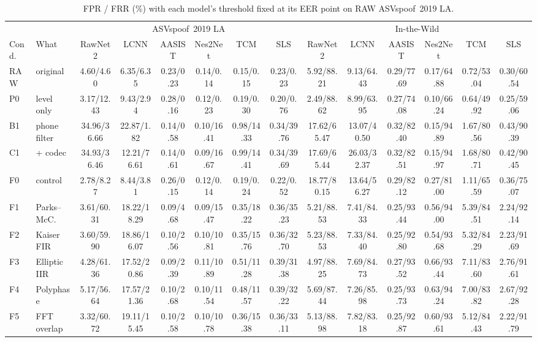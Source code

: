 \documentclass[conference]{IEEEtran}
\begin{document}
\begin{table}[t]
\centering
\caption{FPR / FRR (\%) with each model's threshold fixed at its EER point on RAW ASVspoof~2019 LA.}
\label{tab:fprfrr}
\setlength{\tabcolsep}{2.5pt}
\begin{tabular}{ll|cccccc|cccccc}
\toprule
 & & \multicolumn{6}{c|}{ASVspoof~2019 LA} & \multicolumn{6}{c}{In-the-Wild} \\
Cond. & What & RawNet2 & LCNN & AASIST & Nes2Net & TCM & SLS & RawNet2 & LCNN & AASIST & Nes2Net & TCM & SLS \\
\midrule
RAW & original     & 4.60/4.60 & 6.35/6.35 & 0.23/0.23 & 0.14/0.14 & 0.15/0.15 & 0.23/0.23 & 5.92/88.21 & 9.13/64.43 & 0.29/77.69 & 0.17/64.88 & 0.72/53.04 & 0.30/60.54 \\
P0  & level only   & 3.17/12.43 & 9.43/2.94 & 0.28/0.16 & 0.12/0.23 & 0.19/0.30 & 0.20/0.76 & 2.49/88.62 & 8.99/63.95 & 0.27/74.08 & 0.10/66.24 & 0.64/49.92 & 0.25/59.06 \\
B1  & phone filter & 34.96/36.66 & 22.87/1.82 & 0.14/0.58 & 0.10/16.41 & 0.98/14.33 & 0.34/39.76 & 17.62/65.47 & 13.07/40.50 & 0.32/82.40 & 0.15/94.89 & 1.67/80.56 & 0.43/90.39 \\
C1  & + codec      & 34.93/36.46 & 12.21/76.61 & 0.14/0.61 & 0.09/16.67 & 0.99/14.41 & 0.34/39.69 & 17.69/65.44 & 26.03/32.37 & 0.32/82.51 & 0.15/94.97 & 1.68/80.71 & 0.42/90.45 \\
\midrule
F0  & control      & 2.78/8.27 & 8.44/3.81 & 0.26/0.15 & 0.12/0.14 & 0.19/0.24 & 0.22/0.52 & 18.77/80.15 & 13.64/56.27 & 0.29/82.12 & 0.27/81.00 & 1.11/65.59 & 0.36/75.07 \\
F1  & Parks--McC.  & 3.61/60.31 & 18.22/18.29 & 0.09/4.68 & 0.09/15.47 & 0.35/18.22 & 0.36/35.23 & 5.21/88.53 & 7.41/84.33 & 0.25/93.44 & 0.56/94.00 & 5.39/84.51 & 2.24/92.14 \\
F2  & Kaiser FIR   & 3.60/59.90 & 18.86/16.07 & 0.10/2.56 & 0.10/10.81 & 0.35/15.76 & 0.36/32.70 & 5.23/88.53 & 7.33/84.40 & 0.25/92.80 & 0.54/93.68 & 5.32/84.29 & 2.23/91.69 \\
F3  & Elliptic IIR & 4.28/61.36 & 17.52/20.86 & 0.09/2.39 & 0.11/10.89 & 0.51/11.28 & 0.39/31.38 & 4.97/88.25 & 7.69/84.73 & 0.27/93.52 & 0.66/93.44 & 7.11/83.60 & 2.76/91.61 \\
F4  & Polyphase    & 5.17/56.64 & 17.57/21.36 & 0.10/2.68 & 0.10/11.54 & 0.48/11.57 & 0.39/32.22 & 5.69/87.44 & 7.26/85.98 & 0.25/93.73 & 0.63/94.24 & 7.00/83.82 & 2.67/92.28 \\
F5  & FFT overlap  & 3.32/60.72 & 19.11/15.45 & 0.10/2.58 & 0.10/10.78 & 0.36/15.38 & 0.36/33.11 & 5.13/88.98 & 7.82/83.18 & 0.25/92.87 & 0.60/93.61 & 5.12/84.43 & 2.22/91.79 \\
\bottomrule
\end{tabular}
\end{table}
\end{document}

